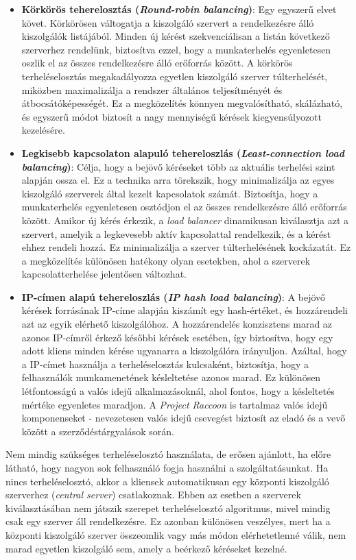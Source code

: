 \begin{itemize}
  \item \textbf{Körkörös teherelosztás (\textit{Round-robin balancing})}: Egy egyszerű elvet követ. Körkörösen váltogatja a kiszolgáló szervert a rendelkezésre álló kiszolgálók listájából. Minden új kérést szekvenciálisan a listán következő szerverhez rendelünk, biztosítva ezzel, hogy a munkaterhelés egyenletesen oszlik el az összes rendelkezésre álló erőforrás között. A körkörös terheléselosztás megakadályozza egyetlen kiszolgáló szerver túlterhelését, miközben maximalizálja a rendszer általános teljesítményét és átbocsátóképességét. Ez a megközelítés könnyen megvalósítható, skálázható, és egyszerű módot biztosít a nagy mennyiségű kérések kiegyensúlyozott kezelésére. \cite{loadbalancing}
  \item \textbf{Legkisebb kapcsolaton alapuló tehereloszlás (\textit{Least-connection load balancing})}: Célja, hogy a bejövő kéréseket több az aktuális terhelési szint alapján ossza el. Ez a technika arra törekszik, hogy minimalizálja az egyes kiszolgáló szerverek által kezelt kapcsolatok számát. \cite{loadbalancing} Biztosítja, hogy a munkaterhelés egyenletesen osztódjon el az összes rendelkezésre álló erőforrás között. Amikor új kérés érkezik, a \textit{load balancer} dinamikusan kiválasztja azt a szervert, amelyik a legkevesebb aktív kapcsolattal rendelkezik, és a kérést ehhez rendeli hozzá. Ez minimalizálja a szerver túlterhelésének kockázatát. Ez a megközelítés különösen hatékony olyan esetekben, ahol a szerverek kapcsolatterhelése jelentősen változhat.
  \item \textbf{IP-címen alapú tehereloszlás (\textit{IP hash load balancing})}: A bejövő kérések forrásának IP-címe alapján kiszámít egy hash-értéket, és hozzárendeli azt az egyik elérhető kiszolgálóhoz. A hozzárendelés konzisztens marad az azonos IP-címről érkező későbbi kérések esetében, így biztosítva, hogy egy adott kliens minden kérése ugyanarra a kiszolgálóra irányuljon. Azáltal, hogy a IP-címet használja a terheléselosztás kulcsaként,  biztosítja, hogy a felhasználók munkamenetének késleltetése azonos marad. \cite{loadbalancingtech} Ez különösen létfontosságú a valós idejű alkalmazásoknál, ahol fontos, hogy a késleltetés mértéke egyenletes maradjon. A \textit{Project Raccoon} is tartalmaz valós idejű komponenseket - nevezetesen valós idejű csevegést biztosít az eladó és a vevő között a szerződéstárgyalások során.
\end{itemize}

Nem mindig szükséges terheléselosztó használata, de erősen ajánlott, ha előre látható, hogy nagyon sok felhasználó fogja használni a szolgáltatásunkat. Ha nincs terheléselosztó, akkor a kliensek automatikusan egy központi kiszolgáló szerverhez (\textit{central server}) csatlakoznak. Ebben az esetben a szerverek kiválasztásában nem játszik szerepet terheléselosztó algoritmus, mivel mindig csak egy szerver áll rendelkezésre. Ez azonban különösen veszélyes, mert ha a központi kiszolgáló szerver összeomlik vagy más módon elérhetetlenné válik, nem marad egyetlen kiszolgáló sem, amely a beérkező kéréseket kezelné.

